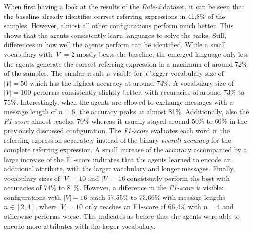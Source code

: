 When first having a look at the results of the \emph{Dale-2} dataset, it can be seen that the baseline already identifies correct referring expressions in 41,8\% of the samples.
However, almost all other configurations perform much better.
This shows that the agents consistently learn languages to solve the tasks.
Still, differences in how well the agents perform can be identified.
While a small vocabulary with $|V| = 2$ mostly beats the baseline, the emerged language only lets the agents generate the correct referring expression in a maximum of around 72\% of the samples.
The similar result is visible for a bigger vocabulary size of $|V|=50$ which has the highest accuracy at around 74\%.
A vocabulary size of $|V|=100$ performs consistently slightly better, with accuracies of around 73\% to 75\%.
Interestingly, when the agents are allowed to exchange messages with a message length of $n=6$, the accuracy peaks at almost 81\%.
Additionally, also the \emph{F1-score} almost reaches 70\% whereas it usually stayed around 50\% to 60\% in the previously discussed configuration.
The \emph{F1-score} evaluates each word in the referring expression separately instead of the binary \emph{overall accuracy} for the complete referring expression.
A small increase of the accuracy accompanied by a large increase of the F1-score indicates that the agents learned to encode an additional attribute, with the larger vocabulary and longer messages.
Finally, vocabulary sizes of $|V|=10$ and $|V|=16$ consistently perform the best with accuracies of 74\% to 81\%.
However, a difference in the \emph{F1-score} is visible: configurations with $|V|=16$ reach 67,55\% to 73,66\% with message lengths $n \in [2,4]$, where $|V|=10$ only reaches an F1-score of 66,4\% with $n=4$ and otherwise performs worse.
This indicates as before that the agents were able to encode more attributes with the larger vocabulary.

